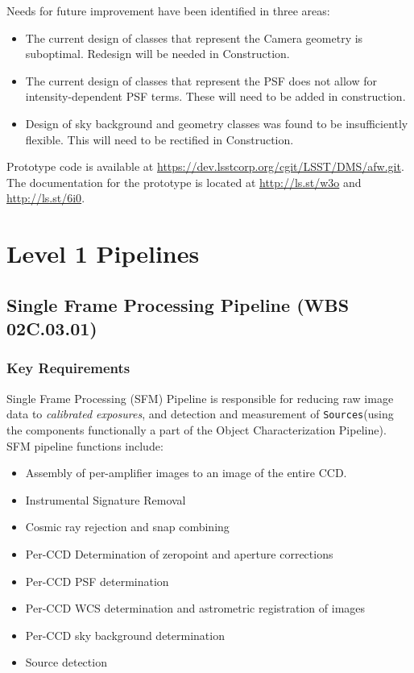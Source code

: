 \documentclass[12pt]{article}
\newcommand{\code}[1]{\texttt{#1}}
\newcommand{\Sources}{\code{Sources}\xspace}
\newcommand{\wbsSFM}{WBS 02C.03.01}
\begin{document}
Needs for future improvement have been identified in three areas:
\begin{itemize}
    \item The current design of classes that represent the Camera geometry is suboptimal. Redesign will be needed in Construction.
    \item The current design of classes that represent the PSF does not allow for intensity-dependent PSF terms. These will need to be added in construction.
    \item Design of sky background and geometry classes was found to be insufficiently flexible. This will need to be rectified in Construction.
\end{itemize}

Prototype code is available at \url{https://dev.lsstcorp.org/cgit/LSST/DMS/afw.git}. The documentation for the prototype is located at \url{http://ls.st/w3o} and \url{http://ls.st/6i0}.

\clearpage

\section{Level 1 Pipelines}

\subsection{Single Frame Processing Pipeline (\wbsSFM)}

\subsubsection{Key Requirements}

Single Frame Processing (SFM) Pipeline is responsible for reducing raw image data to {\em calibrated exposures}, and detection and measurement of \Sources (using the components functionally a part of the Object Characterization Pipeline).
\\

SFM pipeline functions include:
%
\begin{itemize}
    \item Assembly of per-amplifier images to an image of the entire CCD.
    \item Instrumental Signature Removal
    \item Cosmic ray rejection and snap combining
    \item Per-CCD Determination of zeropoint and aperture corrections
    \item Per-CCD PSF determination
    \item Per-CCD WCS determination and astrometric registration of images
    \item Per-CCD sky background determination 
    \item Source detection
\end{itemize}
\end{document}
